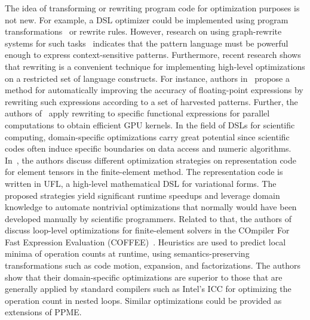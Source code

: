 The idea of transforming or rewriting program code for optimization purposes is not new. 
For example, a DSL optimizer could be implemented using program
transformations~\cite{schordan_user_optimizations_2003} or rewrite rules. However,
research on using graph-rewrite systems for such
tasks~\cite{amann_graph_2000,schoesser_graph_optimizations_2008} indicates that the
pattern language must be powerful enough to express context-sensitive patterns.
%
Furthermore, recent research shows that rewriting is a convenient technique for
implementing high-level optimizations on a restricted set of language constructs. For
instance, authors in~\cite{Panchekha2015} propose a method for
automatically improving the accuracy of floating-point expressions by rewriting such
expressions according to a set of harvested patterns. Further, the authors
of~\cite{steuwer_rewriting_2015} apply rewriting to specific functional expressions
for parallel computations to obtain efficient GPU kernels.
%
In the field of DSLs for scientific computing, domain-specific optimizations carry
great potential since scientific codes often induce specific boundaries on data
access and numeric algorithms. In~\cite{olgaard_fem_optimization_2010}, the authors
discuss different optimization strategies on representation code for element tensors
in the finite-element method. The representation code is written in
UFL, a high-level mathematical DSL for variational forms. The proposed strategies yield significant runtime speedups and leverage
domain knowledge to automate nontrivial optimizations that normally would have been
developed manually by scientific programmers. Related to that, the authors
of~\cite{luporini_algorithm_2016} discuss loop-level optimizations for finite-element
solvers in the COmpiler For Fast Expression Evaluation
(COFFEE)~\cite{luporini_coffee_2015}. Heuristics are used to predict local minima
of operation counts at runtime, using semantics-preserving transformations such as
code motion, expansion, and factorizations. The authors show that their
domain-specific optimizations are superior to those that are generally applied by
standard compilers such as Intel's ICC for optimizing the operation count in nested
loops. Similar optimizations could be provided as extensions of PPME.

